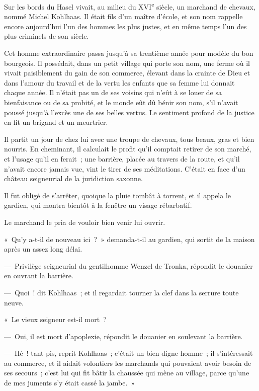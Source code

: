 \documentclass[french,twoside]{book} %
\newcommand\chaptercont{} %
\begin{document}
\chaptercont
\noindent Sur les bords du Hasel vivait, au milieu du XVI\textsuperscript{e} siècle, un marchand de chevaux, nommé Michel Kohlhaas. Il était fils d’un maître d’école, et son nom rappelle encore aujourd’hui l’un des hommes les plus justes, et en même temps l’un des plus criminels de son siècle.\par
Cet homme extraordinaire passa jusqu’à sa trentième année pour modèle du bon bourgeois. Il possédait, dans un petit village qui porte son nom, une ferme où il vivait paisiblement du gain de son commerce, élevant dans la crainte de Dieu et dans l’amour du travail et de la vertu les enfants que sa femme lui donnait chaque année. Il n’était pas un de ses voisins qui n’eût à se louer de sa bienfaisance ou de sa probité, et le monde eût dû bénir son nom, s’il n’avait poussé jusqu’à l’excès une de ses belles vertus. Le sentiment profond de la justice en fit un brigand et un meurtrier.\par
Il partit un jour de chez lui avec une troupe de chevaux, tous beaux, gras et bien nourris. En cheminant, il calculait le profit qu’il comptait retirer de son marché, et l’usage qu’il en ferait ; une barrière, placée au travers de la route, et qu’il n’avait encore jamais vue, vint le tirer de ses méditations. C’était en face d’un château seigneurial de la juridiction saxonne.\par
Il fut obligé de s’arrêter, quoique la pluie tombât à torrent, et il appela le gardien, qui montra bientôt à la fenêtre un visage rébarbatif.\par
Le marchand le pria de vouloir bien venir lui ouvrir.\par
« Qu’y a-t-il de nouveau ici ? » demanda-t-il au gardien, qui sortit de la maison après un assez long délai.\par
— Privilège seigneurial du gentilhomme Wenzel de Tronka, répondit le douanier en ouvrant la barrière.\par
— Quoi ! dit Kohlhaas ; et il regardait tourner la clef dans la serrure toute neuve.\par
« Le vieux seigneur est-il mort ?\par
— Oui, il est mort d’apoplexie, répondit le douanier en soulevant la barrière.\par
— Hé ! tant-pis, reprit Kohlhaas ; c’était un bien digne homme ; il s’intéressait au commerce, et il aidait volontiers les marchands qui pouvaient avoir besoin de ses secours ; c’est lui qui fit bâtir la chaussée qui mène au village, parce qu’une de mes juments s’y était cassé la jambe. »\par
\end{document}
